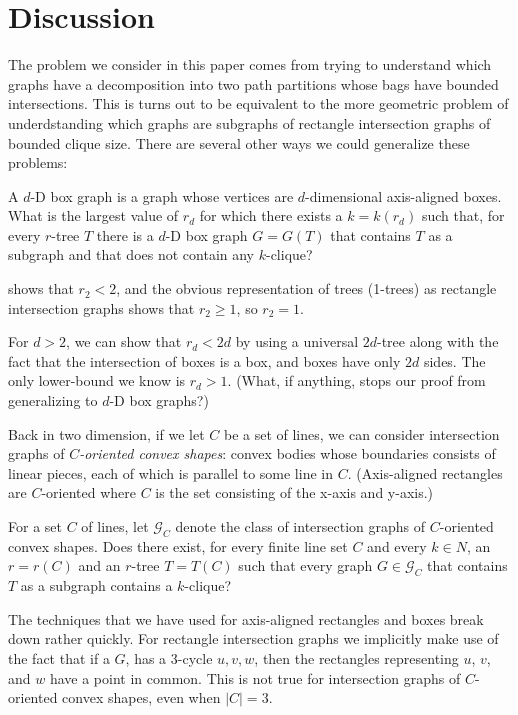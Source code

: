 \documentclass[lotsofwhite]{patmorin}
\begin{document}
\section{Discussion}

The problem we consider in this paper comes from trying to understand
which graphs have a decomposition into two path partitions whose bags
have bounded intersections.  This is turns out to be equivalent to the
more geometric problem of underdstanding which graphs are subgraphs of
rectangle intersection graphs of bounded clique size.  There are several
other ways we could generalize these problems:

\begin{op}
   A $d$-D box graph is a graph whose vertices are $d$-dimensional
   axis-aligned boxes.   What is the largest value of $r_d$ for which
   there exists a $k=k(r_d)$ such that, for every $r$-tree $T$ there is
   a $d$-D box graph $G=G(T)$ that contains $T$ as a subgraph and that
   does not contain any $k$-clique?
\end{op}

 shows that $r_2 < 2$, and the obvious
representation of trees (1-trees) as rectangle intersection graphs shows
that $r_2\ge 1$, so $r_2=1$.

For $d>2$, we can show that $r_d < 2d$ by using a universal $2d$-tree
along with the fact that the intersection of boxes is a box, and boxes
have only $2d$ sides.  The only lower-bound we know is $r_d>1$.  (What,
if anything, stops our proof from generalizing to $d$-D box graphs?)


Back in two dimension, if we let $C$ be a set of lines, we can consider
intersection graphs of \emph{$C$-oriented convex shapes}: convex bodies
whose boundaries consists of linear pieces, each of which is parallel to
some line in $C$.  (Axis-aligned rectangles are $C$-oriented where $C$
is the set consisting of the x-axis and y-axis.)

\begin{op}
   For a set $C$ of lines, let $\mathcal{G}_C$ denote the class of
   intersection graphs of $C$-oriented convex shapes.  Does there exist,
   for every finite line set $C$ and every $k\in N$, an $r=r(C)$ and
   an $r$-tree $T=T(C)$ such that every graph $G\in\mathcal{G}_C$ that
   contains $T$ as a subgraph contains a $k$-clique?
\end{op}

The techniques that we have used for axis-aligned rectangles and
boxes break down rather quickly.  For rectangle intersection graphs we
implicitly make use of the fact that if a $G$, has a 3-cycle $u,v,w$,
then the rectangles representing $u$, $v$, and $w$ have a point in common.
This is not true for intersection graphs of $C$-oriented convex
shapes, even when $|C|=3$.



\end{document}
